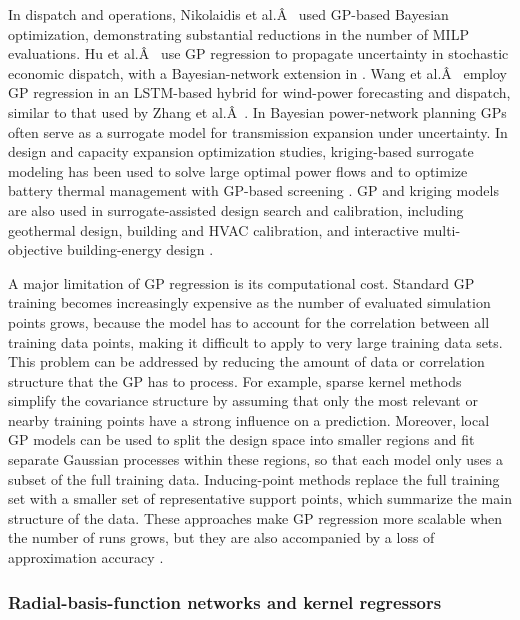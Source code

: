 In dispatch and operations, Nikolaidis et al.Â~\cite{Nikolaidis2021} used
GP-based Bayesian optimization, demonstrating substantial reductions in
the number of MILP evaluations. Hu et al.Â~\cite{Hu2020,Hu2021671} use GP
regression to propagate uncertainty in stochastic economic dispatch,
with a Bayesian-network extension in \cite{Volodina2022}. Wang et
al.Â~\cite{Wang2023} employ GP regression in an LSTM-based hybrid for
wind-power forecasting and dispatch, similar to that used by Zhang et
al.Â~\cite{Zhang2019270}. In Bayesian power-network planning \cite{Lawson201647}
GPs often serve as a surrogate model for transmission expansion under
uncertainty. In design and capacity expansion optimization studies,
kriging-based surrogate modeling has been used to solve large optimal
power flows \cite{Deng2020831} and to optimize battery thermal management
with GP-based screening \cite{Li2021,Babaeiyazdi2021,Kong2021}.
GP and kriging models are also used in surrogate-assisted design search
and calibration, including geothermal design, building and HVAC
calibration, and interactive multi-objective building-energy design
\cite{Schulte2020,Chakrabarty2021,Aghaei Pour2022303}.

A major limitation of GP regression is its computational cost. Standard
GP training becomes increasingly expensive as the number of evaluated
simulation points grows, because the model has to account for the
correlation between all training data points, making it difficult to
apply to very large training data sets. This problem can be addressed by
reducing the amount of data or correlation structure that the GP has to
process. For example, sparse kernel methods simplify the covariance
structure by assuming that only the most relevant or nearby training
points have a strong influence on a prediction. Moreover, local GP
models can be used to split the design space into smaller regions and
fit separate Gaussian processes within these regions, so that each model
only uses a subset of the full training data. Inducing-point methods
replace the full training set with a smaller set of representative
support points, which summarize the main structure of the data. These
approaches make GP regression more scalable when the number of runs
grows, but they are also accompanied by a loss of approximation
accuracy \cite{Hu2020,Volodina2022,Liu20222679}.

\subsubsection{Radial-basis-function networks and kernel regressors}
\label{sec:tax:rbf}

